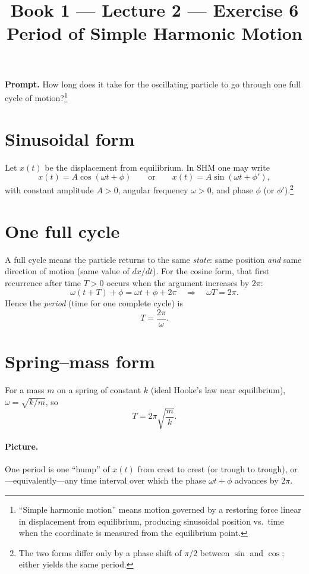 \documentclass[11pt]{article}
\title{\textbf{Book 1 --- Lecture 2 --- Exercise 6}\\[2mm]
\large Period of Simple Harmonic Motion}
\author{}
\date{}
\newcommand{\promptbox}[1]{%
  \begin{savenotes}%
  \begingroup\setlength{\fboxsep}{10pt}\noindent
  \colorbox{blue!8}{\parbox{\dimexpr\linewidth-2\fboxsep\relax}{\textbf{Prompt. }#1}}
  \endgroup
  \end{savenotes}%
}
\begin{document}
\maketitle

\promptbox{How long does it take for the oscillating particle to go through one
full cycle of motion?\footnote{``Simple harmonic motion'' means motion governed by
a restoring force linear in displacement from equilibrium, producing sinusoidal
position vs.\ time when the coordinate is measured from the equilibrium point.}}

\section*{Sinusoidal form}
Let \(x(t)\) be the displacement from equilibrium. In SHM one may write
\[
x(t)=A\cos(\omega t+\phi)\qquad\text{or}\qquad x(t)=A\sin(\omega t+\phi'),
\]
with constant amplitude \(A>0\), angular frequency \(\omega>0\), and phase
\(\phi\) (or \(\phi'\)).\footnote{The two forms differ only by a phase shift of
\(\pi/2\) between \(\sin\) and \(\cos\); either yields the same period.}

\section*{One full cycle}
A full cycle means the particle returns to the same \emph{state}: same position
\emph{and} same direction of motion (same value of \(dx/dt\)). For the cosine
form, that first recurrence after time \(T>0\) occurs when the argument increases
by \(2\pi\):
\[
\omega(t+T)+\phi=\omega t+\phi+2\pi
\quad\Longrightarrow\quad
\omega T=2\pi.
\]
Hence the \emph{period} (time for one complete cycle) is
\[
T=\frac{2\pi}{\omega}.
\]

\section*{Spring--mass form}
For a mass \(m\) on a spring of constant \(k\) (ideal Hooke's law near equilibrium),
\(\omega=\sqrt{k/m}\), so
\[
T=2\pi\sqrt{\frac{m}{k}}.
\]

\paragraph{Picture.}
One period is one ``hump'' of \(x(t)\) from crest to crest (or trough to trough),
or---equivalently---any time interval over which the phase \(\omega t+\phi\) advances
by \(2\pi\).
\end{document}

